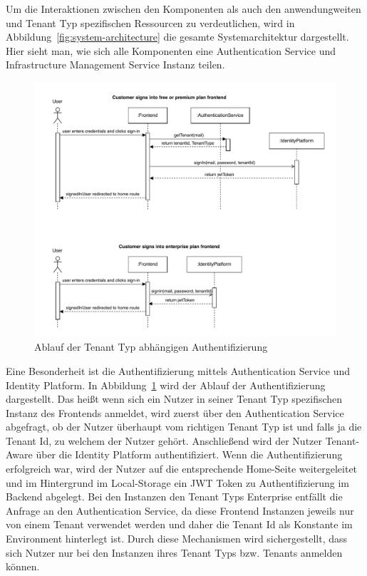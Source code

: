 Um die Interaktionen zwischen den Komponenten als auch den anwendungweiten und Tenant Typ spezifischen Ressourcen zu verdeutlichen, wird in Abbildung~\ref{fig:system-architecture} die gesamte Systemarchitektur dargestellt.
Hier sieht man, wie sich alle Komponenten eine Authentication Service und Infrastructure Management Service Instanz teilen.

\begin{figure}[H]
	\centering
	\includegraphics[width=\textwidth]{resources/03-runtime-view/pdf/authentication-sequence.pdf}
	\caption{Ablauf der Tenant Typ abhängigen Authentifizierung}
	\label{fig:authentication-sequence}
\end{figure}

Eine Besonderheit ist die Authentifizierung mittels Authentication Service und Identity Platform. In Abbildung~\ref{fig:authentication-sequence} wird der Ablauf der Authentifizierung dargestellt. Das heißt wenn sich ein Nutzer in seiner Tenant Typ spezifischen Instanz des Frontends anmeldet, wird zuerst über den Authentication Service abgefragt, ob der Nutzer überhaupt vom richtigen Tenant Typ ist und falls ja die Tenant Id, zu welchem der Nutzer gehört. Anschließend wird der Nutzer Tenant-Aware über die Identity Platform authentifiziert. Wenn die Authentifizierung erfolgreich war, wird der Nutzer auf die entsprechende Home-Seite weitergeleitet und im Hintergrund im Local-Storage ein JWT Token zu Authentifizierung im Backend abgelegt.
Bei den Instanzen den Tenant Typs Enterprise entfällt die Anfrage an den Authentication Service, da diese Frontend Instanzen jeweils nur von einem Tenant verwendet werden und daher die Tenant Id als Konstante im Environment hinterlegt ist.
 Durch diese Mechanismen wird sichergestellt, dass sich Nutzer nur bei den Instanzen ihres Tenant Typs bzw. Tenants anmelden können.

